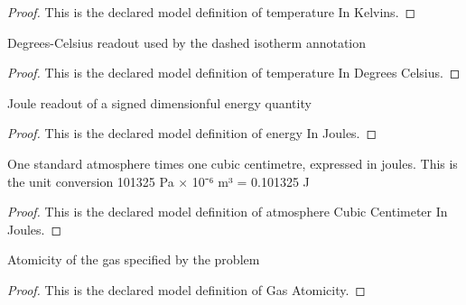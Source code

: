 \begin{proof}
  This is the declared model definition of temperature In Kelvins.
\end{proof}
\begin{definition}
  \label{def:physics:phyx-mini-0412:phyxminiproblems-problemphyxmini0412-temperatureindegreescelsius}
  Degrees-Celsius readout used by the dashed isotherm annotation
\end{definition}
\begin{proof}
  This is the declared model definition of temperature In Degrees Celsius.
\end{proof}
\begin{definition}
  \label{def:physics:phyx-mini-0412:phyxminiproblems-problemphyxmini0412-energyinjoules}
  Joule readout of a signed dimensionful energy quantity
\end{definition}
\begin{proof}
  This is the declared model definition of energy In Joules.
\end{proof}
\begin{definition}
  \label{def:physics:phyx-mini-0412:phyxminiproblems-problemphyxmini0412-atmospherecubiccentimeterinjoules}
  One standard atmosphere times one cubic centimetre, expressed in joules. This is the unit conversion 101325 Pa × 10⁻⁶ m³ = 0.101325 J
\end{definition}
\begin{proof}
  This is the declared model definition of atmosphere Cubic Centimeter In Joules.
\end{proof}
\begin{definition}
  \label{def:physics:phyx-mini-0412:phyxminiproblems-problemphyxmini0412-gasatomicity}
  Atomicity of the gas specified by the problem
\end{definition}
\begin{proof}
  This is the declared model definition of Gas Atomicity.
\end{proof}
